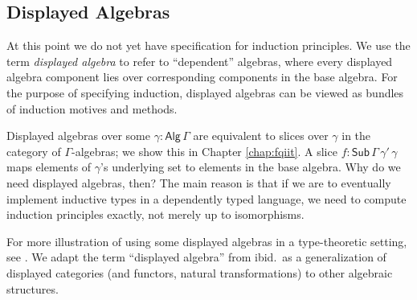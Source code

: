\documentclass[12pt,a4paper,twoside,openany]{book}
\theoremstyle{remark}
\theoremstyle{definition}
\newcommand{\ms}[1]{\mathsf{#1}}
\newcommand{\Sub}{\mathsf{Sub}}
\newcommand{\Alg}{\ms{Alg}}
\begin{document}
\subsection{Displayed Algebras}

At this point we do not yet have specification for induction principles. We use
the term \emph{displayed algebra} to refer to ``dependent'' algebras, where
every displayed algebra component lies over corresponding components in the base
algebra. For the purpose of specifying induction, displayed algebras can be
viewed as bundles of induction motives and methods.

Displayed algebras over some $\gamma : \Alg\,\Gamma$ are equivalent to slices
over $\gamma$ in the category of $\Gamma$-algebras; we show this in Chapter
\ref{chap:fqiit}. A slice $f : \Sub\,\Gamma\,\gamma'\,\gamma$ maps elements of
$\gamma$'s underlying set to elements in the base algebra. Why do we need
displayed algebras, then? The main reason is that if we are to eventually
implement inductive types in a dependently typed language, we need to compute
induction principles exactly, not merely up to isomorphisms.

For more illustration of using some displayed algebras in a type-theoretic
setting, see \cite{displayedcats}. We adapt the term ``displayed algebra'' from
ibid.\ as a generalization of displayed categories (and functors, natural
transformations) to other algebraic structures.
\end{document}
